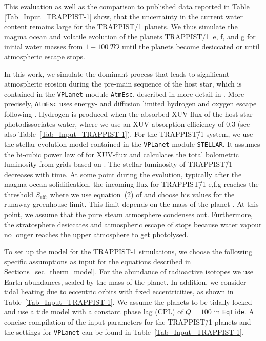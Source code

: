 \documentclass[paper=letterpaper,fontsize=12pt,oneside,twocolumn]{article}
\newcommand{\vplanet}{\texttt{\footnotesize{VPLanet}}}
\newcommand{\atmesc}{\texttt{\footnotesize{AtmEsc}}}
\newcommand{\eqtide}{\texttt{\footnotesize{EqTide}}}
\newcommand{\stellar}{\texttt{\footnotesize{STELLAR}}}
\begin{document}
This evaluation as well as the comparison to published data reported in Table \ref{Tab_Input_TRAPPIST-1} show, that the uncertainty in the current water content remains
large for the TRAPPIST\=/1 planets. We thus simulate the magma ocean and volatile evolution of the planets TRAPPIST\=/1~e, f, and g for initial water masses from $1-\SI{100}{TO}$ until the planets become desiccated or until atmospheric escape stops.

In this work, we simulate the dominant process that leads to significant atmospheric erosion during the pre-main sequence of the host star, which is contained in the \vplanet{} module \atmesc{}, described in more detail in \citet{Barnes2020}. More precisely, \atmesc{} uses energy- and diffusion limited hydrogen and oxygen escape following \citet{Luger2015a,Luger2015}. Hydrogen is produced when the absorbed XUV flux of the host star photodissociates water, where we use an XUV absorption efficiency of 0.3 (see also Table~\ref{Tab_Input_TRAPPIST-1}). For the TRAPPIST\=/1 system, we use the stellar evolution model contained in the \vplanet{} module \stellar{}. It assumes the bi-cubic power law of \citet{Ribas2005} for XUV-flux and calculates the total bolometric luminosity from grids based on \citet{Baraffe2015}. The stellar luminosity of TRAPPIST\=/1 decreases with time. At some point during the evolution, typically after the magma ocean solidification, the incoming flux for TRAPPIST\=/1 e,f,g  reaches the threshold $S_\mathrm{eff}$, where we use equation~(2) of \citet{Kopparapu2013} and choose his values for the runaway greenhouse limit. This limit depends on the mass of the planet \citep{Kopparapu2014}.
At this  point, we assume that the pure steam atmosphere condenses out. 
Furthermore, the stratosphere desiccates and atmospheric escape of  stops because water vapour no longer reaches the upper atmosphere to get photolysed.

To set up the model for the TRAPPIST-1 simulations, we choose the following specific assumptions as input for the equations described in Sections~\ref{sec_therm_model}.
For the abundance of radioactive isotopes we use Earth abundances, scaled by the mass of the planet. In addition, we consider tidal heating due to eccentric orbits with fixed eccentricities, as shown in Table~\ref{Tab_Input_TRAPPIST-1}. We assume the planets to be tidally locked and use a tide model with a constant phase lag (CPL) of $Q = 100$ in \eqtide{}. 
A concise compilation of the input parameters for the TRAPPIST\=/1 planets and the settings for \vplanet{} can be found in Table~\ref{Tab_Input_TRAPPIST-1}. 
\end{document}
